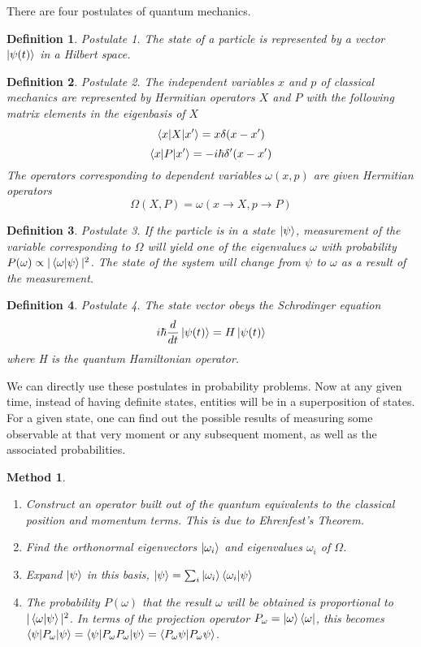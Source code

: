 \documentclass{tufte-book}
\newtheorem{definition}{Definition}
\newtheorem{method}{Method}
\begin{document}
There are four postulates of quantum mechanics.
\begin{definition}
	\label{def:17}
	Postulate 1. The state of a particle is represented by a vector $\ket{\psi(t)}$ in a Hilbert space.
\end{definition}
\begin{definition}
	\label{def:18}
	Postulate 2. The independent variables $x$ and $p$ of classical mechanics are represented by Hermitian operators $X$ and $P$ with the following matrix elements in the eigenbasis of $X$
	\[\braket{x|X|x'} = x\delta(x-x')\]
	\[\braket{x|P|x'} = -i\hbar\delta'(x-x')\]
	The operators corresponding to dependent variables $\omega(x, p)$ are given Hermitian operators
	\[\Omega(X, P) = \omega(x\rightarrow X, p\rightarrow P)\]
\end{definition}
\begin{definition}
	\label{def:19}
	Postulate 3. If the particle is in a state $\ket{\psi}$, measurement of the variable corresponding to $\Omega$ will yield one of the eigenvalues $\omega$ with probability $P(\omega)\propto|\braket{\omega|\psi}|^2$. The state of the system will change from $\psi$ to $\omega$ as a result of the measurement.
\end{definition}
\begin{definition}
	\label{def:20}
	Postulate 4. The state vector obeys the Schrodinger equation
	\[i\hbar\frac{d}{dt}\ket{\psi(t)} = H\ket{\psi(t)}\]
	where H is the quantum Hamiltonian operator.
\end{definition}

We can directly use these postulates in probability problems. Now at any given time, instead of having definite states, entities will be in a superposition of states. For a given state, one can find out the possible results of measuring some observable at that very moment or any subsequent moment, as well as the associated probabilities.

\begin{method}
	\label{meth:2}
	\begin{enumerate}
		\item Construct an operator built out of the quantum equivalents to the classical position and momentum terms. This is due to Ehrenfest's Theorem.
		\item Find the orthonormal eigenvectors $\ket{\omega_i}$ and eigenvalues $\omega_i$ of $\Omega$.
		\item Expand $\ket{\psi}$ in this basis, $\ket{\psi} = \sum_i\ket{\omega_i}\braket{\omega_i|\psi}$
		\item The probability $P(\omega)$ that the result $\omega$ will be obtained is proportional to $|\braket{\omega|\psi}|^2$. In terms of the projection operator $P_{\omega} = \ket{\omega}\bra{\omega}$, this becomes $\braket{\psi|P_{\omega}|\psi} = \braket{\psi|P_{\omega}P_{\omega}|\psi} = \braket{P_{\omega}\psi|P_{\omega}\psi}$.
	\end{enumerate}
\end{method}
\end{document}
